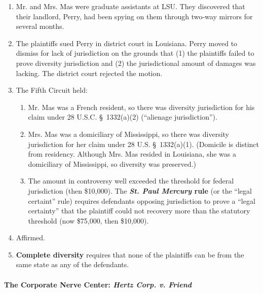 \begin{enumerate}
    \item Mr. and Mrs. Mas were graduate assistants at LSU. They discovered that their landlord, Perry, had been spying on them through two-way mirrors for several months.
    \item The plaintiffs sued Perry in district court in Louisiana. Perry moved to dismiss for lack of jurisdiction on the grounds that (1) the plaintiffs failed to prove diversity jurisdiction and (2) the jurisdictional amount of damages was lacking. The district court rejected the motion.
    \item The Fifth Circuit held:
    \begin{enumerate}
        \item Mr. Mas was a French resident, so there was diversity jurisdiction for his claim under 28 U.S.C. \S\ 1332(a)(2) (``alienage jurisdiction'').
        \item Mrs. Mas was a domiciliary of Mississippi, so there was diversity jurisdiction for her claim under 28 U.S. \S\ 1332(a)(1). (Domicile is distinct from residency. Although Mrs. Mas resided in Louisiana, she was a domiciliary of Mississippi, so diversity was preserved.)
        \item The amount in controversy well exceeded the threshold for federal jurisdiction (then \$10,000). The \textbf{\emph{St. Paul Mercury} rule} (or the ``legal certaint'' rule) requires defendants opposing jurisdiction to prove a ``legal certainty'' that the plaintiff could not recovery more than the statutory threshold (now \$75,000, then \$10,000).
    \end{enumerate}
    \item Affirmed.
    \item \textbf{Complete diversity} requires that none of the plaintiffs can be from the same state as any of the defendants.
\end{enumerate}

\paragraph{The Corporate Nerve Center: \emph{Hertz Corp. v. Friend}}

